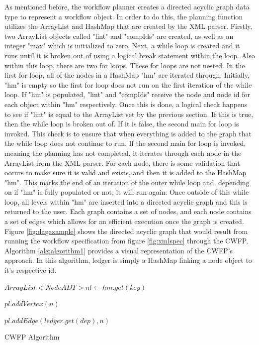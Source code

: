 \documentclass[fleqn,10pt]{SelfArx} %
\begin{document}
As mentioned before, the workflow planner creates a directed acyclic graph data type to represent a workflow object. In order to do this, the planning function utilizes the ArrayList and HashMap that are created by the XML parser. Firstly, two ArrayList objects called "lint" and "compIds" are created, as well as an integer "max" which is initialized to zero. Next, a while loop is created and it runs until it is broken out of using a logical break statement within the loop. Also within this loop, there are two for loops. These for loops are not nested. In the first for loop, all of the nodes in a HashMap "hm" are iterated through. Initially, "hm" is empty so the first for loop does not run on the first iteration of the while loop. If "hm" is populated, "lint" and "compIds" receive the node and node id for each object within "hm" respectively. Once this is done, a logical check happens to see if "lint" is equal to the ArrayList set by the previous section. If this is true, then the while loop is broken out of. If it is false, the second main for loop is invoked. This check is to ensure that when everything is added to the graph that the while loop does not continue to run. If the second main for loop is invoked, meaning the planning has not completed, it iterates through each node in the ArrayList from the XML parser. For each node, there is some validation that occurs to make sure it is valid and exists, and then it is added to the HashMap "hm". This marks the end of an iteration of the outer while loop and, depending on if "hm" is fully populated or not, it will run again. Once outside of this while loop, all levels within "hm" are inserted into a directed acyclic graph and this is returned to the user. Each graph contains a set of nodes, and each node contains a set of edges which allows for an efficient execution once the graph is created. Figure \ref{fig:dagexample} shows the directed acyclic graph that would result from running the workflow specification from figure \ref{fig:xmlspec} through the CWFP. Algorithm \ref{alg:algorithm1} provides a visual representation of the CWFP's approach. In this algorithm, ledger is simply a HashMap linking a node object to it's respective id.

\begin{algorithm}
\footnotesize
{}
\DontPrintSemicolon
{}
 {
	$ArrayList<NodeADT> nl \gets hm.get(key)$

	 {
		$pl.addVertex(n)$

		 {

			 {

				$pl.addEdge(ledger.get(dep), n)$
			}
		}
	}
}

\caption{CWFP Algorithm}
\label{alg:algorithm1}
\end{algorithm}
\end{document}
